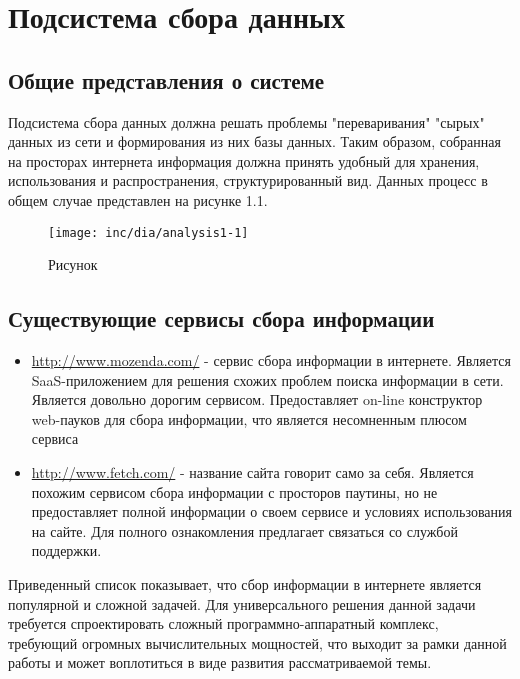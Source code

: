 \section{Подсистема сбора данных}
\subsection{Общие представления о системе}

Подсистема сбора данных должна решать проблемы "переваривания" "сырых" данных из сети и формирования из них базы данных. Таким образом, собранная на просторах интернета информация должна принять удобный для хранения, использования и распространения, структурированный вид. Данных процесс в общем случае представлен на рисунке 1.1.
\begin{figure}
  \centering
  \texttt{[image: inc/dia/analysis1-1]}
  \caption{Рисунок}
  \label{fig:fig01}
\end{figure}


\subsection{Существующие сервисы сбора информации}

\begin{itemize}
\item \url{http://www.mozenda.com/} - сервис сбора информации в интернете. Является SaaS-приложением для решения схожих проблем поиска информации в сети. Является довольно дорогим сервисом. Предоставляет on-line конструктор web-пауков для сбора информации, что является несомненным плюсом сервиса
\item \url{http://www.fetch.com/} - название сайта говорит само за себя. Является похожим сервисом сбора информации с просторов паутины, но не предоставляет полной информации о своем сервисе и условиях использования на сайте. Для полного ознакомления предлагает связаться со службой поддержки.
\end{itemize}

Приведенный список показывает, что сбор информации в интернете является популярной и сложной задачей. Для универсального решения данной задачи требуется спроектировать сложный программно-аппаратный комплекс, требующий огромных вычислительных мощностей, что выходит за рамки данной работы и может воплотиться в виде развития рассматриваемой темы. 

